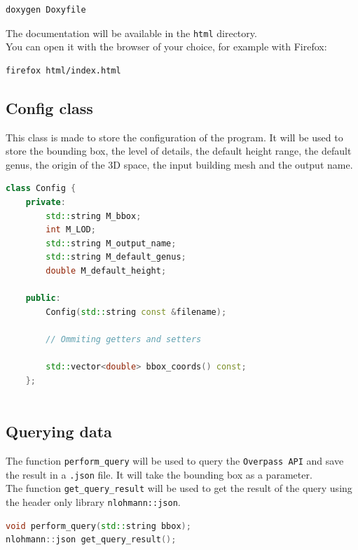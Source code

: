 \documentclass[12pt]{article}
\begin{document}
\begin{lstlisting}[language=bash]
doxygen Doxyfile
\end{lstlisting}

The documentation will be available in the \texttt{html} directory.\\
You can open it with the browser of your choice, for example with Firefox:

\begin{lstlisting}[language=bash]
firefox html/index.html
\end{lstlisting}

\subsection{Config class}

This class is made to store the configuration of the program. It will be used to
store the bounding box, the level of details, the default height range, the default
genus, the origin of the 3D space, the input building mesh and the output name.

\begin{lstlisting}[language=C++]
class Config {
    private:
        std::string M_bbox;
        int M_LOD;
        std::string M_output_name;
        std::string M_default_genus;
        double M_default_height;
    
    public:
        Config(std::string const &filename);

        // Ommiting getters and setters

        std::vector<double> bbox_coords() const;
    };
    
\end{lstlisting}

\subsection{Querying data}

The function \texttt{perform\_query} will be used to query the \texttt{Overpass API}
and save the result in a \texttt{.json} file. It will take the bounding box as a
parameter. \\
The function \texttt{get\_query\_result} will be used to get the result of the query
 using the header only library \texttt{nlohmann::json}.

\begin{lstlisting}[language=C++]
void perform_query(std::string bbox);
nlohmann::json get_query_result();
\end{lstlisting}
\end{document}
